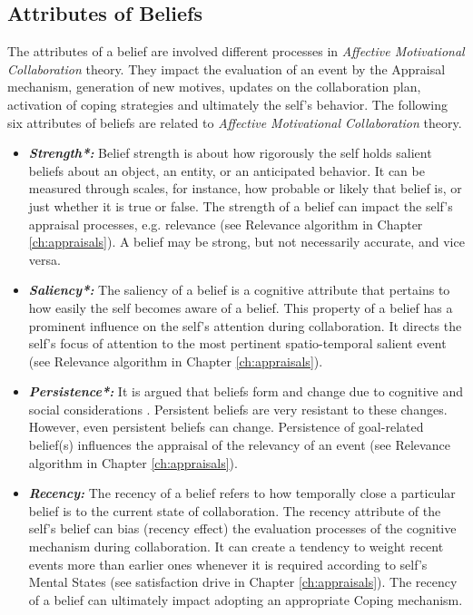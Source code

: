 \documentclass[12pt]{report}
\begin{document}
\subsection{Attributes of Beliefs}

The attributes of a belief are involved different processes in \textit{Affective
Motivational Collaboration} theory. They impact the evaluation of an event by
the Appraisal mechanism, generation of new motives, updates on the collaboration
plan, activation of coping strategies and ultimately the self's behavior. The
following six attributes of beliefs are related to \textit{Affective
Motivational Collaboration} theory.

\begin{itemize}
  \item \textbf{\textit{Strength*:}} Belief strength is about how rigorously
  the self holds salient beliefs about an object, an entity, or an anticipated
  behavior. It can be measured through scales, for instance, how probable or
  likely that belief is, or just whether it is true or false. The strength of a
  belief can impact the self's appraisal processes, e.g. relevance (see
  Relevance algorithm in Chapter \ref{ch:appraisals}). A belief may be strong,
  but not necessarily accurate, and vice versa.
  
  \item \textbf{\textit{Saliency*:}} The saliency of a belief is a cognitive
  attribute that pertains to how easily the self becomes aware of a belief.
  This property of a belief has a prominent influence on the self's attention
  during collaboration. It directs the self's focus of attention to the most
  pertinent spatio-temporal salient event (see Relevance algorithm in Chapter
  \ref{ch:appraisals}).
  
  \item \textbf{\textit{Persistence*:}} It is argued that beliefs form and
  change due to cognitive and social considerations
  \cite{carley:belief-persistence}. Persistent beliefs are very resistant to
  these changes. However, even persistent beliefs can change. Persistence of
  goal-related belief(s) influences the appraisal of the relevancy of an event
  (see Relevance algorithm in Chapter \ref{ch:appraisals}).
  
  \item \textbf{\textit{Recency:}} The recency of a belief refers to how
  temporally close a particular belief is to the current state of collaboration.
  The recency attribute of the self's belief can bias (recency effect) the
  evaluation processes of the cognitive mechanism during collaboration. It can
  create a tendency to weight recent events more than earlier ones whenever it
  is required according to self's Mental States (see satisfaction drive in
  Chapter \ref{ch:appraisals}). The recency of a belief can ultimately impact
  adopting an appropriate Coping mechanism.
  

\end{itemize}
\end{document}

